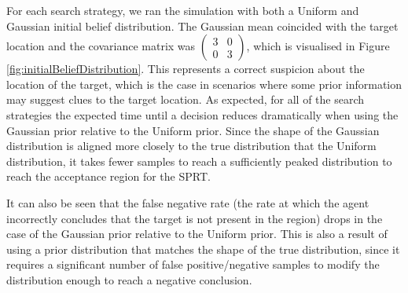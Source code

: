For each search strategy, we ran the simulation with both a Uniform and Gaussian initial belief distribution. The Gaussian mean coincided with the target location and the covariance matrix was $\begin{pmatrix} 3 & 0\\ 0 & 3\end{pmatrix}$, which is visualised in Figure \ref{fig:initialBeliefDistribution}. This represents a correct suspicion about the location of the target, which is the case in scenarios where some prior information may suggest clues to the target location. As expected, for all of the search strategies the expected time until a decision reduces dramatically when using the Gaussian prior relative to the Uniform prior. 
Since the shape of the Gaussian distribution is aligned more closely to the true distribution that the Uniform distribution, it takes fewer samples to reach a sufficiently peaked distribution to reach the acceptance region for the SPRT. 

\par It can also be seen that the false negative rate (the rate at which the agent incorrectly concludes that the target is not present in the region) drops in the case of the Gaussian prior relative to the Uniform prior. This is also a result of using a prior distribution that matches the shape of the true distribution, since it requires a significant number of false positive/negative samples to modify the distribution enough to reach a negative conclusion.


   


